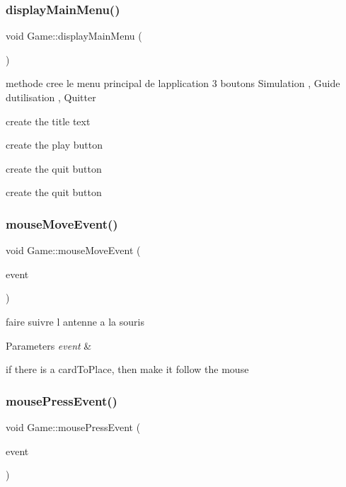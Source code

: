 \subsubsection{\texorpdfstring{displayMainMenu()}{displayMainMenu()}}
{\footnotesize\ttfamily void Game\+::display\+Main\+Menu (\begin{DoxyParamCaption}{ }\end{DoxyParamCaption})}



methode cree le menu principal de l\textquotesingle{}application 3 boutons Simulation , Guide d\textquotesingle{}utilisation , Quitter 

create the title text

create the play button

create the quit button

create the quit button \mbox{\label{class_game_ad761e49ff42758930e76b477d08ba068}} 
\subsubsection{\texorpdfstring{mouseMoveEvent()}{mouseMoveEvent()}}
{\footnotesize\ttfamily void Game\+::mouse\+Move\+Event (\begin{DoxyParamCaption}\item[{Q\+Mouse\+Event $\ast$}]{event }\end{DoxyParamCaption})}



faire suivre l antenne a la souris 


\begin{DoxyParams}{Parameters}
{\em event} & \\
\hline
\end{DoxyParams}
if there is a card\+To\+Place, then make it follow the mouse \mbox{\label{class_game_a704ba119948eebd1b6dfc547de967796}} 
\subsubsection{\texorpdfstring{mousePressEvent()}{mousePressEvent()}}
{\footnotesize\ttfamily void Game\+::mouse\+Press\+Event (\begin{DoxyParamCaption}\item[{Q\+Mouse\+Event $\ast$}]{event }\end{DoxyParamCaption})}


